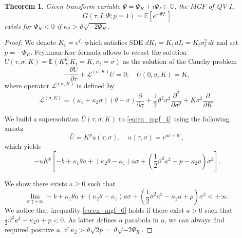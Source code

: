 \documentclass[pdftex,11pt,a4paper] {article}
\newtheorem{theorem}{Theorem}[section]
\begin{document}
\begin{theorem}\label{thm::existence_MGF_I}
Given transform variable $\Psi=\Psi_R+i\Psi_I\in \mathbb{C}$, the MGF of QV $I_\tau$
\begin{equation*}
G(\tau,I;\Psi;p=1)=\mathbb{E}[e^{-\Psi I_\tau}]
\end{equation*}
exists for $\Psi_R<0$ if $\kappa_2>\vartheta\sqrt{-2\Psi_R}$.
\end{theorem}
\begin{proof}
We denote $K_t=e^{I_t}$ which satisfies SDE $dK_t=K_t\, dI_t = K_t\sigma_t^2\, dt$
and set $p=-\Psi_R$. Feynman-Kac formula allows to recast the solution 
$
U(\tau, \sigma, K)=\mathbb{E}\left(\left. K_T^{p}\right| K_t=K, \sigma_t=\sigma\right)
$
as the solution of the Cauchy problem
\begin{equation}\label{eq:ex_mgf_4}
-\frac{\partial U}{\partial\tau}+\mathcal{L}^{(\sigma, K)}U=0,\quad U(0,\sigma,K)=K,
\end{equation}
where operator $\mathcal{L}^{(\sigma, K)}$ is defined by
\begin{equation*}
\mathcal{L}^{(\sigma, K)}=(\kappa_1+\kappa_2\sigma)(\theta-\sigma)\frac{\partial}{\partial\sigma}+
\frac{1}{2}\vartheta^2\sigma^2\frac{\partial^2}{\partial\sigma^2}+K\sigma^2\frac{\partial}{\partial K}.
\end{equation*}

We build a supersolution $\bar{U}(\tau, \sigma, K)$ to \eqref{eq:ex_mgf_4} using the following ansatz 
\begin{equation}\label{eq:ex_mgf_5}
\bar{U}=K^{p}u(\tau,\sigma),\quad u(\tau,\sigma)=e^{a\sigma+b\tau},
\end{equation}
which yields
\begin{equation*}
-uK^{p}\left[-b+\kappa_1\theta a+(\kappa_2\theta-\kappa_1)a\sigma + \left(\frac{1}{2}\vartheta^2a^2+p-\kappa_2a\right)\sigma^2\right].
\end{equation*}

We show there exists $a\ge 0$ such that
\begin{equation}\label{eq:ex_mgf_6}
\lim_{\sigma\uparrow+\infty}-b+\kappa_1\theta a+(\kappa_2\theta-\kappa_1)a\sigma + \left(\frac{1}{2}\vartheta^2a^2-\kappa_2a+p\right)\sigma^2<+\infty.
\end{equation}
We notice that inequality \eqref{eq:ex_mgf_6} holds if there exist $a>0$ such that
$
\frac{1}{2}\vartheta^2a^2-\kappa_2a+p<0
$. 
As latter defines a parabola in $a$, we can always find required positive $a$, if 
$
\kappa_2>\vartheta\sqrt{2p}=\vartheta\sqrt{-2\Psi_R}.
$
\end{proof}
\end{document}
